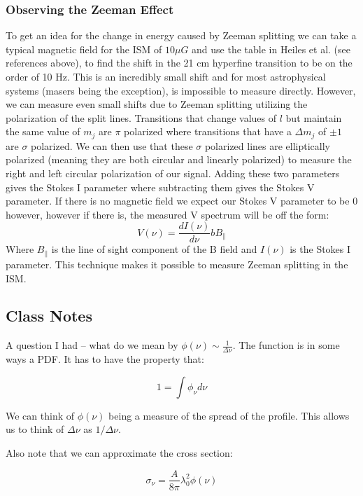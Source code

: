 \documentclass{article}
\newcommand{\be}{\begin{equation}}
\newcommand{\ee}{\end{equation}}
\begin{document}
 \subsubsection{Observing the Zeeman Effect}
 To get an idea for the change in energy caused by Zeeman splitting we can take a typical magnetic field for the ISM of $10\mu G$ and use the table in Heiles et al. (see references above), to find the shift in the 21 cm hyperfine transition to be on the order of 10 Hz. This is an incredibly small shift and for most astrophysical systems (masers being the exception), is impossible to measure directly. However, we can measure even small shifts due to Zeeman splitting utilizing the polarization of the split lines. Transitions that change values of $l$ but maintain the same value of $m_j$ are $\pi$ polarized where transitions that have a $\Delta m_j$ of $\pm 1$ are $\sigma$ polarized. We can then use that these $\sigma$ polarized lines are elliptically polarized (meaning they are both circular and linearly polarized) to measure the right and left circular polarization of our signal. Adding these two parameters gives the Stokes I parameter where subtracting them gives the Stokes V parameter. If there is no magnetic field we expect our Stokes V parameter to be 0 however, however if there is, the measured V spectrum will be off the form:
 \begin{equation}
 V(\nu) = \frac{dI (\nu)}{d \nu}bB_{\parallel}
 \end{equation}
 Where  $B_{\parallel}$ is the line of sight component of the B field and $I(\nu)$ is the Stokes I parameter. This technique makes it possible to measure Zeeman splitting in the ISM.  

\subsection{Class Notes}

A question I had -- what do we mean by $\phi(\nu) \sim \frac{1}{\Delta \nu}$. The function is in some ways a PDF. It has to have the property that:

\be
1 = \int \phi_\nu d\nu
\ee

We can think of $\phi(\nu)$ being a measure of the spread of the profile. This allows us to think of $\Delta \nu$ as $1/\Delta \nu$. 

Also note that we can approximate the cross section:

\begin{equation}
    \sigma_\nu = \frac{A}{8\pi} \lambda_0^2 \phi(\nu)
\end{equation}
\end{document}
